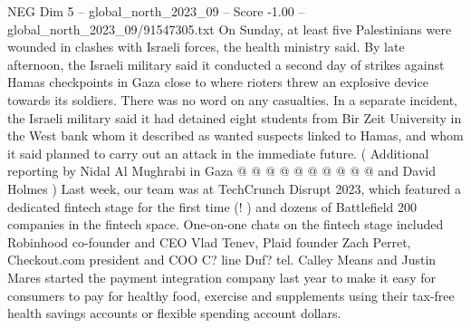 \begin{textsample}{NEG Dim 5 – global\_north\_2023\_09 – Score -1.00 – global\_north\_2023\_09/91547305.txt}
On Sunday, at least five Palestinians were wounded in clashes with Israeli forces, the health ministry said.
By late afternoon, the Israeli military said it conducted a second day of strikes against Hamas checkpoints in Gaza close to where rioters threw an explosive device towards its soldiers.
There was no word on any casualties.
In a separate incident, the Israeli military said it had detained eight students from Bir Zeit University in the West bank whom it described as wanted suspects linked to Hamas, and whom it said planned to carry out an attack in the immediate future. ( Additional reporting by Nidal Al Mughrabi in Gaza @ @ @ @ @ @ @ @ @ @ and David Holmes ) Last week, our team was at TechCrunch Disrupt 2023, which featured a dedicated fintech stage for the first time (! ) and dozens of Battlefield 200 companies in the fintech space.
One-on-one chats on the fintech stage included Robinhood co-founder and CEO Vlad Tenev, Plaid founder Zach Perret, Checkout.com president and COO C? line Duf? tel.
Calley Means and Justin Mares started the payment integration company last year to make it easy for consumers to pay for healthy food, exercise and supplements using their tax-free health savings accounts or flexible spending account dollars.

\end{textsample}
